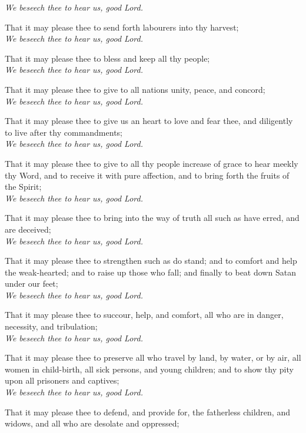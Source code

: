     \textit{We beseech thee to hear us, good Lord.}
    \par
    That it may please thee to send forth labourers into thy harvest;\\
    \textit{We beseech thee to hear us, good Lord.}
    \par
That it may please thee to bless and keep all thy people;\\
    \textit{We beseech thee to hear us, good Lord.}
    \par
That it may please thee to give to all nations unity, peace, and concord;\\
    \textit{We beseech thee to hear us, good Lord.}
    \par
That it may please thee to give us an heart to love and fear thee, and diligently to live after thy commandments;\\
    \textit{We beseech thee to hear us, good Lord.}
    \par
    That it may please thee to give to all thy people increase of grace to hear meekly thy Word, and to receive it with pure affection, and to bring forth the fruits of the Spirit;\\
    \textit{We beseech thee to hear us, good Lord.}
    \par
    That it may please thee to bring into the way of truth all such as have erred, and are deceived;\\
    \textit{We beseech thee to hear us, good Lord.}
    \par
    That it may please thee to strengthen such as do stand; and to comfort and help the weak-hearted; and to raise up those who fall; and finally to beat down Satan under our feet;\\
    \textit{We beseech thee to hear us, good Lord.}
    \par
    That it may please thee to succour, help, and comfort, all who are in danger, necessity, and tribulation;\\
    \textit{We beseech thee to hear us, good Lord.}
    \par
    That it may please thee to preserve all who travel by land, by water, or by air, all women in child-birth, all sick persons, and young children; and to show thy pity upon all prisoners and captives;\\
    \textit{We beseech thee to hear us, good Lord.}
    \par
    That it may please thee to defend, and provide for, the fatherless children, and widows, and all who are desolate and oppressed;\\
